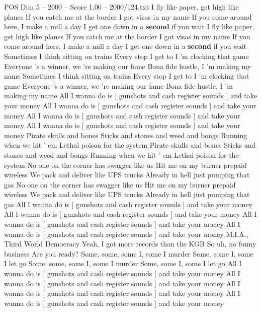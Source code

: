 \begin{textsample}{POS Dim 5 – 2000 – Score 1.00 – 2000/124.txt}  \label{ex:f5_pos_007}
I fly like paper, get high like planes If you catch me at the border I got visas in my name If you come around here, I make a mill a day I get one down in a \textbf{second} if you wait I fly like paper, get high like planes If you catch me at the border I got visas in my name If you come around here, I make a mill a day I get one down in a \textbf{second} if you wait Sometimes I think sitting on trains Every stop I get to I 'm clocking that game Everyone 's a winner, we 're making our fame Bona fide hustle, I 'm making my name Sometimes I think sitting on trains Every stop I get to I 'm clocking that game Everyone 's a winner, we 're making our fame Bona fide hustle, I 'm making my name All I wanna do is [ gunshots and cash register sounds ] and take your money All I wanna do is [ gunshots and cash register sounds ] and take your money All I wanna do is [ gunshots and cash register sounds ] and take your money All I wanna do is [ gunshots and cash register sounds ] and take your money Pirate skulls and bones Sticks and stones and weed and bongs Running when we hit ' em Lethal poison for the system Pirate skulls and bones Sticks and stones and weed and bongs Running when we hit ' em Lethal poison for the system No one on the corner has swagger like us Hit me on my burner prepaid wireless We pack and deliver like UPS trucks Already in hell just pumping that gas No one on the corner has swagger like us Hit me on my burner prepaid wireless We pack and deliver like UPS trucks Already in hell just pumping that gas All I wanna do is [ gunshots and cash register sounds ] and take your money All I wanna do is [ gunshots and cash register sounds ] and take your money All I wanna do is [ gunshots and cash register sounds ] and take your money All I wanna do is [ gunshots and cash register sounds ] and take your money M.I.A., Third World Democracy Yeah, I got more records than the KGB So uh, no funny business Are you ready?
Some, some, some I, some I murder Some, some I, some I let go Some, some, some I, some I murder Some, some I, some I let go All I wanna do is [ gunshots and cash register sounds ] and take your money All I wanna do is [ gunshots and cash register sounds ] and take your money All I wanna do is [ gunshots and cash register sounds ] and take your money All I wanna do is [ gunshots and cash register sounds ] and take your money

\end{textsample}
